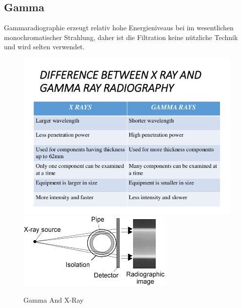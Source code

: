 \subsection{Gamma}
Gammaradiographie erzeugt relativ hohe Energieniveaus bei im wesentlichen monochromatischer Strahlung, daher ist die Filtration keine nützliche Technik und wird selten verwendet.
\begin{figure}[htb]
  \centering 
 \includegraphics[scale=0.6]{img/gammaAndx-ray.jpg}
 \includegraphics[scale=0.5]{img/x-ray.png}
 \caption{Gamma And X-Ray}
  \label{fig:gammaAndx-ray}
\end{figure}














